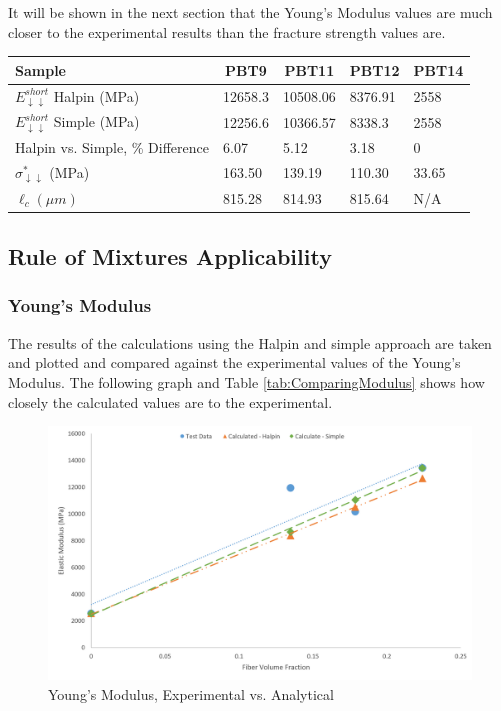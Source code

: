 \documentclass[11pt]{article}
\begin{document}
It will be shown in the next section that the Young's Modulus values are much closer to the experimental results than the fracture strength values are.

\newpage
\begin{center}
 \label{tab:CalculatedValues}
\begin{tabular}{p{3.5cm} || p{} | p{} | p{} | p{}}
\hline
Sample & \multicolumn{1}{c|}{PBT9} & \multicolumn{1}{c|}{PBT11} & \multicolumn{1}{c|}{PBT12} & \multicolumn{1}{c}{PBT14} \\
\hline
\hline
\(E^{short}_{\downarrow \downarrow}\) Halpin (MPa)& 12658.3 &  10508.06 & 8376.91 & 2558\\
\(E^{short}_{\downarrow \downarrow}\) Simple (MPa)& 12256.6 & 10366.57 & 8338.3 & 2558\\
\hline
Halpin vs. Simple, \% Difference & 6.07 & 5.12 & 3.18 & 0\\
\hline
\(\sigma^*_{\downarrow \downarrow}\) (MPa)& 163.50 & 139.19 & 110.30 & 33.65\\
\(\ell_c (\mu m) \) & 815.28 & 814.93 & 815.64 & N/A\\
\hline

\end{tabular}
\end{center}
\singlespacing

\subsection{Rule of Mixtures Applicability}

\subsubsection{Young's Modulus}

The results of the calculations using the Halpin and simple approach are taken and plotted and compared against the experimental values of the Young's Modulus. The following graph and Table \ref{tab:ComparingModulus} shows how closely the calculated values are to the experimental.

\begin{figure}[H]
\centering
\includegraphics[width=.95\linewidth]{figures/modulus_test_vs_calc.png}
\caption{Young's Modulus, Experimental vs. Analytical}
\label{ModulusCompare}
\end{figure}
\end{document}
